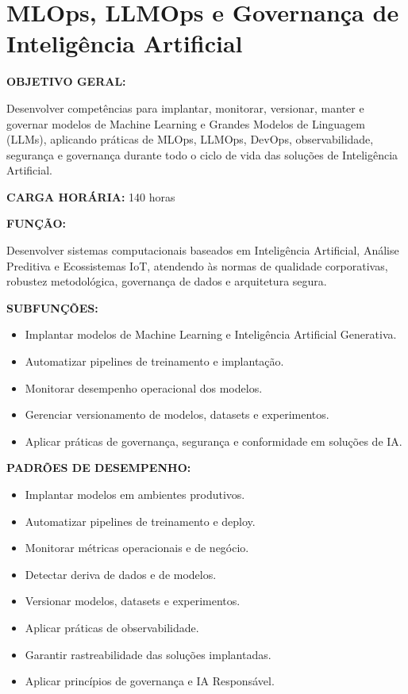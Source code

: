 \section{MLOps, LLMOps e Governança de Inteligência Artificial}

\textbf{OBJETIVO GERAL:}

Desenvolver competências para implantar, monitorar, versionar, manter e governar modelos de Machine Learning e Grandes Modelos de Linguagem (LLMs), aplicando práticas de MLOps, LLMOps, DevOps, observabilidade, segurança e governança durante todo o ciclo de vida das soluções de Inteligência Artificial.

\textbf{CARGA HORÁRIA:} 140 horas

\textbf{FUNÇÃO:}

Desenvolver sistemas computacionais baseados em Inteligência Artificial, Análise Preditiva e Ecossistemas IoT, atendendo às normas de qualidade corporativas, robustez metodológica, governança de dados e arquitetura segura.

\textbf{SUBFUNÇÕES:}

\begin{itemize}
\item Implantar modelos de Machine Learning e Inteligência Artificial Generativa.
\item Automatizar pipelines de treinamento e implantação.
\item Monitorar desempenho operacional dos modelos.
\item Gerenciar versionamento de modelos, datasets e experimentos.
\item Aplicar práticas de governança, segurança e conformidade em soluções de IA.
\end{itemize}

\textbf{PADRÕES DE DESEMPENHO:}

\begin{itemize}
\item Implantar modelos em ambientes produtivos.
\item Automatizar pipelines de treinamento e deploy.
\item Monitorar métricas operacionais e de negócio.
\item Detectar deriva de dados e de modelos.
\item Versionar modelos, datasets e experimentos.
\item Aplicar práticas de observabilidade.
\item Garantir rastreabilidade das soluções implantadas.
\item Aplicar princípios de governança e IA Responsável.
\end{itemize}

